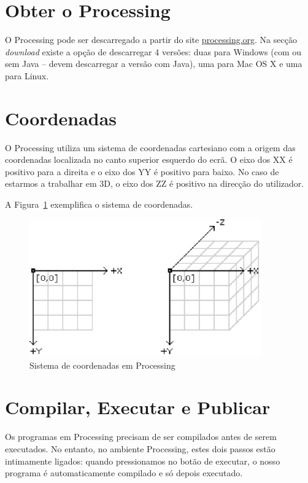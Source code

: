 \section{Obter o Processing}
O Processing pode ser descarregado a partir do site \url{processing.org}. Na secção \emph{download} existe a opção de descarregar 4 versões: duas para Windows (com ou sem Java -- devem descarregar a versão com Java), uma para Mac OS X e uma para Linux.



\section{Coordenadas}
O Processing utiliza um sistema de coordenadas cartesiano com a origem das coordenadas localizada no canto superior esquerdo do ecrã. O eixo dos XX é positivo para a direita e o eixo dos YY é positivo para baixo. No caso de estarmos a trabalhar em 3D, o eixo dos ZZ é positivo na direcção do utilizador.

A Figura~\ref{fig:coordinates} exemplifica o sistema de coordenadas.
\begin{figure}[htbp]
	\centering
		\includegraphics[width=10cm]{images/coordinates.eps}
	\caption{Sistema de coordenadas em Processing}
	\label{fig:coordinates}
\end{figure} 

\section{Compilar, Executar e Publicar}
Os programas em Processing precisam de ser compilados antes de serem executados. No entanto, no ambiente Processing, estes dois passos estão intimamente ligados: quando pressionamos no botão de executar, o nosso programa é automaticamente compilado e só depois executado.


